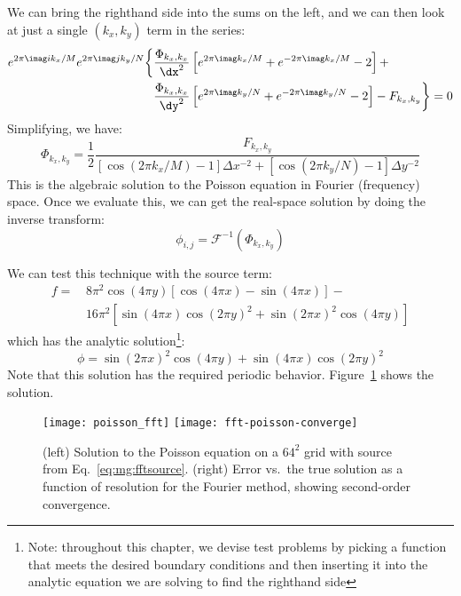 We can bring the righthand side into the sums on the left, and we can
then look at just a single $(k_x,k_y)$ term in the series:
\begin{align}
  e^{2\pi\imag i k_x/M} e^{2\pi\imag j k_y/N}
  \biggl \{
  &\frac{\Phi_{k_x,k_x}}{\dx^2}
  \left [e^{2\pi\imag k_x/M} + e^{-2\pi\imag k_x/M} - 2 \right ] + \nonumber \\
  &\frac{\Phi_{k_x,k_x}}{\dy^2}
  \left [e^{2\pi\imag k_y/N} + e^{-2\pi\imag k_y/N} - 2 \right ] 
  - F_{k_x,k_y}
  \biggr \} = 0
\end{align}
Simplifying, we have:
\begin{equation}
  \Phi_{k_x,k_y} = \frac{1}{2}\frac{F_{k_x,k_y}}
      {\left [\cos(2\pi k_x/M) - 1 \right ] \Delta x^{-2} +
        \left [\cos(2\pi k_y/N) - 1 \right ] \Delta y^{-2}}
      \label{eq:FFTsol}
\end{equation}
This is the algebraic solution to the Poisson equation in Fourier (frequency)
space.  Once we evaluate this, we can get the real-space solution
by doing the inverse transform:
\begin{equation}
\phi_{i,j} = \mathcal{F}^{-1}(\Phi_{k_x,k_y})
\end{equation}


We can test this technique with the source term:
\begin{align}
f =\, & 8\pi^2\cos(4\pi y) \left [\cos(4\pi x) - \sin(4\pi x) \right ] - \nonumber \\
    & 16\pi^2 \left [ \sin(4\pi x)\cos(2\pi y)^2 + \sin(2\pi x)^2 \cos(4\pi y) \right ]
    \label{eq:mg:fftsource}
\end{align}
which has the analytic solution\footnote{Note: throughout this
chapter, we devise test problems by picking a function
that meets the desired boundary conditions and then inserting
it into the analytic equation we are solving to find the righthand
side}:
\begin{equation}
\phi = \sin(2\pi x)^2 \cos(4\pi y) + \sin(4\pi x)\cos(2\pi y)^2
\end{equation}
Note that this solution has the required periodic behavior.
Figure~\ref{fig:mg:fftpoisson} shows the solution.

\begin{figure}[t]
\centering
\texttt{[image: poisson\_fft]}
\texttt{[image: fft-poisson-converge]}
\caption[FFT solution to the Poisson
  equation]{\label{fig:mg:fftpoisson} (left) Solution to the Poisson
  equation on a $64^2$ grid with source from
  Eq.~\ref{eq:mg:fftsource}. (right) Error vs.\ the true solution as a
  function of resolution for the Fourier method, showing second-order
  convergence.
  }
\end{figure}


